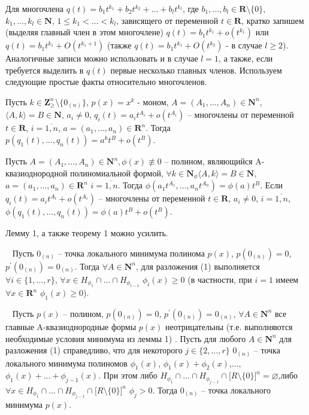 Для многочлена $q(t)=b_{1}t^{k_1}+b_{2}t^{k_2}+\dots+b_{l}t^{k_l}$, где $b_1,\dots,b_l \in\mathbf{R}\setminus\{0\}$, $k_1,\dots,k_l \in \mathbf{N}$, $1\leq k_1 < \dots < k_l$, зависящего от переменной $t \in \mathbf{R}$, кратко запишем (выделяя главный член  в этом многочлене) $q(t)=b_{1}t^{k_1}+o(t^{k_1})$ или $q(t)=b_{1}t^{k_1}+O(t^{k_1+1})$ (также $q(t)=b_{1}t^{k_1}+O(t^{k_2})$ - в случае $l\geq 2 $). Аналогичные записи можно использовать и в случае $l=1$, а также, если требуется выделить в $q(t)$ первые несколько главных членов. Используем следующие простые факты относительно многочленов.

Пусть $k \in \mathbf{Z}^{n}_{\geq} \setminus\{0_{(n)}\}$, $p(x)=x^k$ - моном, $A=(A_1,\dots,A_n)\in\mathbf{N}^n$, $\langle A,k\rangle = B\in\mathbf{N}$, $a_i\neq 0$, $q_i(t)=a_it^{A_i} +o(t^{A_i})$ – многочлены от переменной $t\in\mathbf{R}$, $i=\overline{1,n}$, $a=(a_1,\dots,a_n)\in\mathbf{R}^n$. Тогда $p(q_1(t),\dots,q_n(t))=a^kt^B+o(t^B)$.

Пусть $A=(A_1,\dots,A_n) \in \mathbf{N}^n,\phi(x)\not\equiv 0$ – полином, являющийся A-квазиоднородной полиномиальной формой, $\forall k \in\mathbf{N}_\phi  \langle A,k\rangle = B\in\mathbf{N}$, $a=(a_1,\dots,a_n)\in\mathbf{R}^n$ $i=\overline{1,n}$. Тогда $\phi(a_1t^{A_1},\dots,a_nt^{A_n})=\phi(a)t^B$. Если $q_i(t)=a_it^{A_i}+o(t^{A_i})$ – многочлены от переменной  $t\in\mathbf{R}$, $a_i\neq0$, $i=\overline{1,n}$, $\phi(q_1(t),\dots,q_n(t))=\phi(a)t^B+o(t^B)$.

Лемму 1, а также теорему 1 можно усилить.

\begin{lemma}~\cite{nef:3} \label{nef:lem:2} {Пусть $0_{(n)}$  – точка локального минимума полинома $p(x)$, $p(0_{(n)})=0$, $p^\prime(0_{(n)})=0_{(n)}$. Тогда $\forall A \in\mathbf{N}^n$, для разложения (1) выполняется $\forall i \in\{1,\dots,r\}$, $\forall x\in H_{\phi_1}\cap\dots\cap H_{\phi_{i-1}}$ $\phi_i(x)\geq 0$ (в частности, при $i=1$ имеем $\forall x \in\mathbf{R}^n$ $\phi_1(x)\geq0$).	}
\end{lemma}

\begin{theorem}~\cite{nef:3} \label{nef:thm:2} {Пусть $p(x)$ – полином, $p(0_{(n)})=0$, $p^\prime(0_{(n)})=0_{(n)}$, $\forall A \in\mathbf{N}^n$ все главные A-квазиоднородные формы $p(x)$ неотрицательны (т.е. выполняются необходимые условия минимума из леммы 1) . Пусть для любого $A\in\mathbf{N}^n$ для разложения (1) справедливо, что для некоторого $j \in \{2,\dots,r\}$ $0_{(n)}$ – точка локального минимума полиномов $\phi_1(x)$,  $\phi_1(x)+\phi_2(x)$,$\ldots$,$\phi_1(x)+\dots+\phi_{j-1}(x)$. При этом либо $H_{\phi_1}\cap\dots\cap H_{\phi_{j-1}}\cap\bigl[R\setminus\{0\}\bigr]^n =\varnothing$,либо $\forall x\in H_{\phi_1}\cap\dots\cap H_{\phi_{j-1}}\cap\bigl[R\setminus\{0\}\bigr]^n$ $\phi_j>0$. Тогда $0_{(n)}$ – точка локального минимума $p(x)$.}
\end{theorem}


